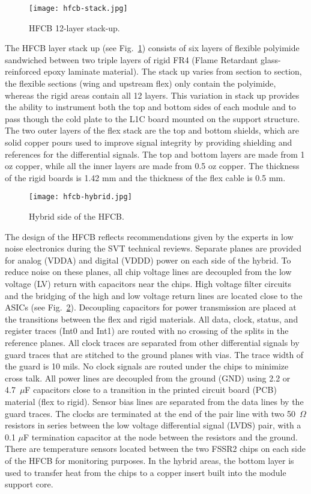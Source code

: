\begin{figure}[hbt] 
\centering 
\texttt{[image: hfcb-stack.jpg]}
\caption{HFCB 12-layer stack-up.}
\label{fig:hfcb-stack}
\end{figure}

The HFCB layer stack up (see Fig.~\ref{fig:hfcb-stack}) consists of six layers of flexible polyimide sandwiched between two triple layers of rigid FR4 (Flame Retardant glass-reinforced epoxy laminate material). The stack up varies from section to section, the flexible sections (wing and upstream flex) only contain the polyimide, whereas the rigid areas contain all 12 layers. This variation in stack up provides the ability to instrument both the top and bottom sides of each module and to pass though the cold plate to the L1C board mounted on the support structure. The two outer layers of the flex stack are the top and bottom shields, which are solid copper pours used to improve signal integrity by providing shielding and references for the differential signals. The top and bottom layers are made from 1 oz copper, while all the inner layers are made from 0.5 oz copper. The thickness of the rigid boards is 1.42 mm and the thickness of the flex cable is 0.5 mm.

\begin{figure}[hbt] 
\centering 
\texttt{[image: hfcb-hybrid.jpg]}
\caption{Hybrid side of the HFCB.}
\label{fig:hfcb-hybrid}
\end{figure}

The design of the HFCB reflects recommendations given by the experts in low noise  electronics during the SVT technical reviews. Separate planes are provided for analog (VDDA) and digital (VDDD) power on each side of the hybrid. To reduce noise on these planes, all chip voltage lines are decoupled from the low voltage (LV) return with capacitors near the chips. High voltage filter circuits and the bridging of the high and low voltage return lines are located close to the ASICs (see Fig.~\ref{fig:hfcb-hybrid}). Decoupling capacitors for power transmission are placed at the transitions between the flex and rigid materials. All data, clock, status, and register traces (Int0 and Int1) are routed with no crossing of the splits in the reference planes. All clock traces are separated from other differential signals by guard traces that are stitched to the ground planes with vias. The trace width of the guard is 10 mils. No clock signals are routed under the chips to minimize cross talk. All power lines are  decoupled from the ground (GND) using 2.2 or 4.7~$\mu$F capacitors close to a transition in the printed circuit board (PCB) material (flex to rigid). Sensor bias lines are separated from the data lines by the guard traces. The clocks are terminated at the end of the pair line with two 50~$\Omega$ resistors in series between the low voltage differential signal (LVDS) pair, with a 0.1 $\mu$F termination capacitor at the node between the resistors and the ground. There are temperature sensors located between the two FSSR2 chips on each side of the HFCB for monitoring purposes. In the hybrid areas, the bottom layer is used to transfer heat from the chips to a copper insert built into the module support core. 

